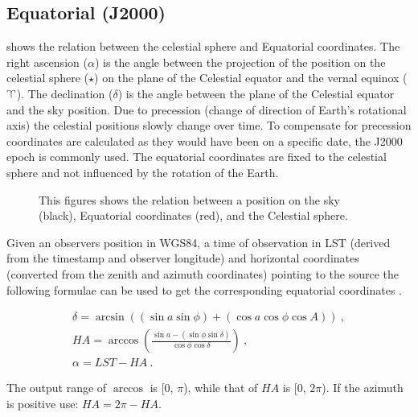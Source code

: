 \subsection{Equatorial (J2000)}

 shows the relation between the celestial sphere
and Equatorial coordinates. The right ascension ($\alpha$) is the angle
between the projection of the position on the celestial sphere ($\star$)
on the plane of the Celestial equator and the vernal equinox
($\vernal$). The declination ($\delta$) is the angle between the plane
of the Celestial equator and the sky position. Due to precession (change
of direction of Earth's rotational axis) the celestial positions slowly
change over time. To compensate for precession coordinates are
calculated as they would have been on a specific date, the J2000 epoch
is commonly used. The equatorial coordinates are fixed to the celestial
sphere and not influenced by the rotation of the Earth.

\begin{figure}
    \centering
    
    \caption{This figures shows the relation between a position on the
             sky (black), Equatorial coordinates (red), and the
             Celestial sphere.}
    \label{fig:equatorial}
\end{figure}

Given an observers position in WGS84, a time of observation in LST
(derived from the \gps timestamp and observer longitude) and horizontal
coordinates (converted from the zenith and azimuth coordinates) pointing
to the source the following formulae can be used to get the
corresponding equatorial coordinates \cite[p. 37]{duffet-smith:1990aa}.

\begin{equation}
    \label{eq:equatorial}
    \begin{array}{l}
        \delta = \arcsin{\left((\sin{a} \sin{\phi}) +
                               (\cos{a} \cos{\phi} \cos{A})\right)} \ , \\
        \mathit{HA} = \arccos{\left(\frac{\sin{a} - (\sin{\phi} \sin{\delta})}
                                         {\cos{\phi} \cos{\delta}}\right)} \ , \\
        \alpha = \mathit{LST} - \mathit{HA} \ .
    \end{array}
\end{equation}

The output range of $\arccos$ is [0, $\pi$), while that of $\mathit{HA}$ is
[0, $2\pi$). If the azimuth is positive use: $\mathit{HA} = 2 \pi -
\mathit{HA}$.

